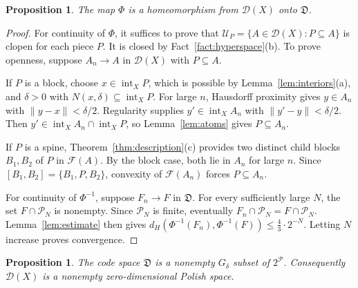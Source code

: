 \documentclass[11pt]{amsart}
\newtheorem{proposition}[theorem]{Proposition}
\theoremstyle{definition}
\theoremstyle{remark}
\newcommand{\intX}{\operatorname{int}_X}
\newcommand{\D}{\mathcal{D}}
\newcommand{\Pc}{\mathcal{P}}
\newcommand{\Fc}{\mathcal{F}}
\newcommand{\Uc}{\mathcal{U}}
\newcommand{\Dc}{\mathfrak{D}}
\newcommand{\dH}{d_H}
\begin{document}
\begin{proposition}\label{prop:homeo}
The map $\Phi$ is a homeomorphism from $\D(X)$ onto $\Dc$.
\end{proposition}

\begin{proof}
For continuity of $\Phi$, it suffices to prove that $\Uc_P=\{A\in\D(X): P\subseteq A\}$ is clopen for each piece $P$. It is closed by Fact~\ref{fact:hyperspace}(b). To prove openness, suppose $A_n\to A$ in $\D(X)$ with $P\subseteq A$.

If $P$ is a block, choose $x\in\intX P$, which is possible by Lemma~\ref{lem:interiors}(a), and $\delta>0$ with $N(x,\delta)\subseteq\intX P$. For large $n$, Hausdorff proximity gives $y\in A_n$ with $\|y-x\|<\delta/2$. Regularity supplies $y'\in\intX A_n$ with $\|y'-y\|<\delta/2$. Then $y'\in\intX A_n\cap\intX P$, so Lemma~\ref{lem:atoms} gives $P\subseteq A_n$.

If $P$ is a spine, Theorem~\ref{thm:description}(c) provides two distinct child blocks $B_1,B_2$ of $P$ in $\Fc(A)$. By the block case, both lie in $A_n$ for large $n$. Since $[B_1,B_2]=\{B_1,P,B_2\}$, convexity of $\Fc(A_n)$ forces $P\subseteq A_n$.

For continuity of $\Phi^{-1}$, suppose $F_n\to F$ in $\Dc$. For every sufficiently large $N$, the set $F\cap\Pc_N$ is nonempty. Since $\Pc_N$ is finite, eventually $F_n\cap\Pc_N=F\cap\Pc_N$. Lemma~\ref{lem:estimate} then gives $\dH(\Phi^{-1}(F_n),\Phi^{-1}(F))\le\frac43\cdot2^{-N}$. Letting $N$ increase proves convergence.
\end{proof}

\begin{proposition}\label{prop:Gdelta}
The code space $\Dc$ is a nonempty $G_\delta$ subset of $2^\Pc$. Consequently $\D(X)$ is a nonempty zero-dimensional Polish space.
\end{proposition}
\end{document}
